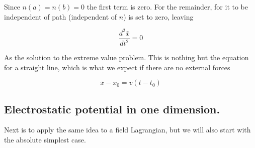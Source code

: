 \documentclass{article}
\begin{document}
Since $n(a) = n(b) = 0$ the first term is zero.  For the remainder, for it to be independent of path (independent of $n$) is set to zero, leaving

\begin{equation*}
\frac{d^2\bar{x}}{dt^2} = 0
\end{equation*}

As the solution to the extreme value problem.  This is nothing but the equation for a straight line, which is what we expect if there are no external forces

\begin{equation*}
\bar{x} - x_0 = v(t - t_0)
\end{equation*}

\subsection{ Electrostatic potential in one dimension. }

Next is to apply the same idea to a field Lagrangian, but we will also start with the absolute simplest case.


\end{document}

